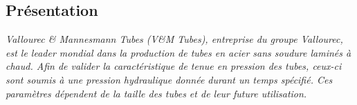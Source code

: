 \documentclass[10pt,fleqn]{article} %
\begin{document}

\vspace{4.4cm}
\pagestyle{fancy}
\thispagestyle{plain}

\def\columnseprulecolor{\color{ocre}}
\setlength{\columnseprule}{0.4pt} 

\def\pathfig{images}

\begin{multicols}{2}
\subsection*{Présentation}
\footnotesize{\textit{
Vallourec \& Mannesmann Tubes (V\&M Tubes), entreprise du groupe Vallourec, est le leader mondial dans la production de tubes en acier sans soudure laminés à chaud. %
Afin de valider la caractéristique de tenue en pression des tubes, ceux-ci sont soumis à une pression hydraulique donnée durant un temps spécifié. Ces paramètres dépendent de la taille des tubes et de leur future utilisation.
}}


\end{multicols}
\end{document}
